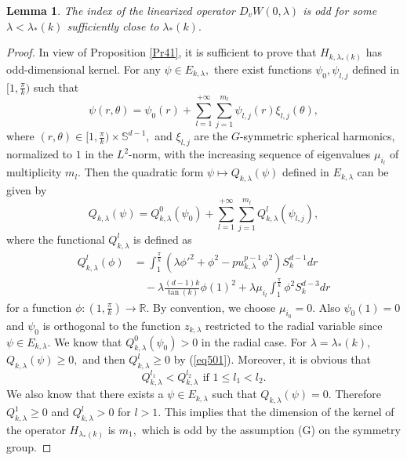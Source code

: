 \documentclass[reqno]{amsart}
\newtheorem{lemma}[theorem]{Lemma}
\numberwithin{equation}{section}
\newenvironment{key words}{\textbf{Keywords}\mbox{  }}{ }
\begin{document}
\begin{lemma} \label{Le51}
The index of the linearized operator $D_{v}W(0,\lambda)$ is odd for some $\lambda < \lambda_{\ast}(k)$ sufficiently close to $\lambda_{\ast}(k).$
 \end{lemma}
\begin{proof}
In view of Proposition \ref{Pr41}, it is sufficient to prove that $H_{k,\lambda_{\ast}(k)}$ has odd-dimensional kernel. For any $\psi\in E_{k, \lambda},$ there exist functions $\psi_{0},\psi_{l,j}$ defined in $[1,\frac{\pi}{k})$ such that
\[\psi(r,\theta)=\psi_{0}(r)+\sum_{l=1}^{+\infty}\sum_{j=1}^{m_{l}}\psi_{l,j}(r)\xi_{l,j}(\theta),\]
where $(r,\theta)\in [1,\frac{\pi}{k})\times \mathbb{S}^{d-1},$ and $\xi_{l,j}$ are the $G$-symmetric spherical harmonics, normalized to $1$ in the $L^{2}$-norm, with the increasing sequence of eigenvalues $\mu_{i_{l}}$ of multiplicity $m_{l}.$ Then the quadratic form $\psi\mapsto Q_{k, \lambda}(\psi)$ defined in $E_{k, \lambda}$ can be given by
\begin{equation}\label{eq501}
Q_{k, \lambda}(\psi)=Q_{k,\lambda}^{0}(\psi_{0})+\sum_{l=1}^{+\infty}\sum_{j=1}^{m_{l}}Q_{k,\lambda}^{l}(\psi_{l,j}),
\end{equation}
where the functional $Q_{k,\lambda}^{l}$ is defined as
\begin{align*}
Q_{k,\lambda}^{l}(\phi)&=\int_{1}^{\frac{\pi}{k}}(\lambda\phi'^{2}+\phi^{2}-pu_{k,\lambda}^{p-1}\phi^{2})S_{k}^{d-1}dr\\
&\quad-\lambda\frac{(d-1)k}{\tan(k)}\phi(1)^{2}
+\lambda\mu_{i_{l}}\int_{1}^{\frac{\pi}{k}}\phi^{2}S_{k}^{d-3}dr
\end{align*}
for a function $\phi:\left(1,\frac{\pi}{k}\right)\rightarrow\mathbb{R}.$ By convention, we choose $\mu_{i_{0}}=0.$ Also $\psi_{0}(1)=0$ and $\psi_{0}$ is orthogonal to the function $z_{k,\lambda}$ restricted to the radial variable since $\psi\in E_{k,\lambda}.$ We know that $Q_{k,\lambda}^{0}(\psi_{0})>0$ in the radial case. For $\lambda=\lambda_{\ast}(k),$ $Q_{k, \lambda}(\psi)\geq0,$ and then $Q_{k,\lambda}^{l}\geq0$ by (\ref{eq501}). Moreover, it is obvious that
\[Q_{k,\lambda}^{l_1}<Q_{k,\lambda}^{l_2} \,~\mbox {if} \,\,1\leq l_{1}<l_{2}.\]
We also know that there exists a $\psi\in E_{k,\lambda}$ such that $Q_{k, \lambda}(\psi)=0.$ Therefore $Q_{k,\lambda}^{1}\geq0$ and $Q_{k,\lambda}^{l}>0$ for $l>1.$ This implies that the dimension of the kernel of the operator $H_{\lambda_{\ast}(k)}$ is $m_{1},$ which is odd by the assumption (G) on the symmetry group.
 \end{proof}
\end{document}
